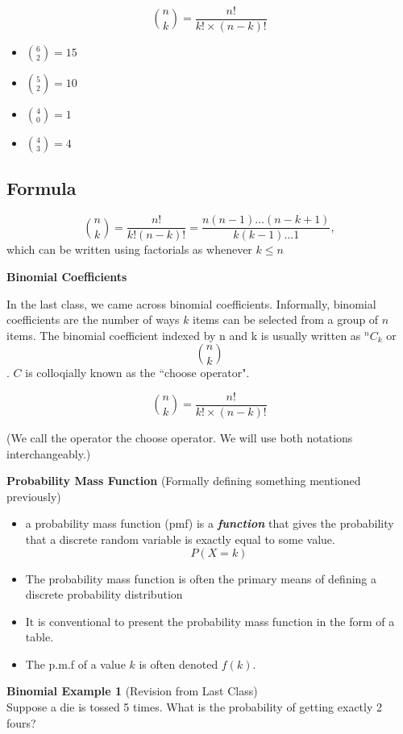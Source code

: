 \documentclass[]{report}
\begin{document}
	{
		
		\begin{framed}
			
			\[ {n \choose k} = \frac{n!}{k! \times (n-k)!} \]
		\end{framed}		
		\begin{multicols}{2}
			\begin{itemize}
				\item ${6 \choose 2} = 15$
				\item ${5 \choose 2} = 10$  
				\item ${4 \choose 0} = 1$  
				\item ${4 \choose 3} = 4$  
			\end{itemize}
		\end{multicols}	
		
		
		
		\subsection*{Formula}
		\[ \binom nk  = \frac{n!}{k!(n-k)!} = \frac{n(n-1)\ldots(n-k+1)}{k(k-1)\dots 1},\]
		which can be written using factorials as  whenever $k\leq n$
		
{
	\textbf{Binomial Coefficients}
	
	In the last class, we came across binomial coefficients. Informally, binomial coefficients are the number of ways $k$ items can be selected from a group of $n$ items. 
	The binomial coefficient indexed by n and k is usually written as $^nC_k$ or
	\[ {n \choose k}\].
	$C$ is colloqially known as the ``choose operator".
	
	\[ {n \choose k} = \frac{n!}{k! \times (n-k)!} \]
	
	(We call the operator the choose operator. We will use both notations interchangeably.)
	
	

}
{
	\textbf{Probability Mass Function}
	(Formally defining something mentioned previously)
	\begin{itemize} \item a probability mass function (pmf) is a \textbf{\emph{function}}
		that gives the probability that a discrete random variable is exactly equal to some
		value.
		\[P(X=k)\]
		\item The probability mass function is often the primary means of defining a discrete
		probability distribution
		\item It is conventional to present the probability mass function in the form of a table.
		\item The p.m.f of a value $k$ is often denoted $f(k)$.
	\end{itemize}
}
{
	\textbf{ Binomial Example 1 }
	(Revision from Last Class)\\
	Suppose a die is tossed 5 times. What is the probability of getting exactly 2 fours?
	
}}
\end{document}
